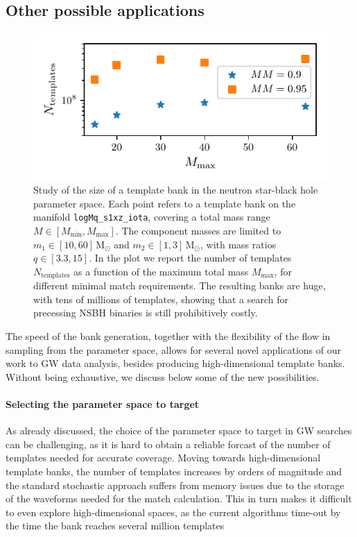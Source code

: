 \documentclass[twocolumn,showpacs,preprintnumbers,nofootinbib,prd,
superscriptaddress,10pt]{revtex4-2}
\begin{document}
\subsection{Other possible applications} \label{sec:other_applications}

\begin{figure}[t]
	\centering
	\includegraphics[scale = 1.]{NSBH_size}
	\caption{Study of the size of a template bank in the neutron star-black hole parameter space. Each point refers to a template bank on the manifold \texttt{logMq\_s1xz\_iota}, covering a total mass range $M\in[M_\text{min}, M_\text{max}]$. The component masses are limited to $m_1 \in [10, 60]\,\mathrm{M_\odot}$ and  $m_2 \in [1, 3]\,\mathrm{M_\odot}$, with mass ratios $q \in [3.3, 15]$. In the plot we report the number of templates $N_\text{templates}$ as a function of the maximum total mass $M_\text{max}$, for different minimal match requirements. The resulting banks are huge, with tens of millions of templates, showing that a search for precessing NSBH binaries is still prohibitively costly.}
	\label{fig:NSBH_size}
\end{figure}

The speed of the bank generation, together with the flexibility of the flow in sampling from the parameter space, allows for several novel applications of our work to GW data analysis, besides producing high-dimensional template banks.
Without being exhaustive, we discuss below some of the new possibilities.


\paragraph{Selecting the parameter space to target}\label{par:parameter_space_selection}
As already discussed, the choice of the parameter space to target in GW searches can be challenging, as it is hard to obtain a reliable forcast of the number of templates needed for accurate coverage.
Moving towards high-dimensional template banks, the number of templates increases by orders of magnitude and the standard stochastic approach suffers from memory issues due to the storage of the waveforms needed for the match calculation.
This in turn makes it difficult to even explore high-dimensional spaces, as the current algorithms time-out by the time the bank reaches several million templates
\end{document}
